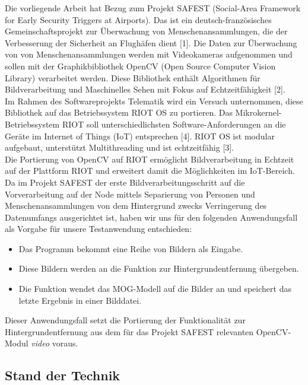 \documentclass[10pt,a4paper]{article}
\begin{document}
Die vorliegende Arbeit hat Bezug zum Projekt SAFEST (Social-Area Framework for Early Security Triggers at Airports). Das ist ein deutsch-französisches Gemeinschaftsprojekt zur Überwachung von Menschenansammlungen, die der Verbesserung der Sicherheit an Flughäfen dient [1]. Die Daten zur Überwachung von von Menschenansammlungen werden mit Videokameras aufgenommen und sollen mit der Graphikbibliothek OpenCV (Open Source Computer Vision Library) verarbeitet werden. Diese Bibliothek enthält Algorithmen für Bildverarbeitung und Maschinelles Sehen mit Fokus auf Echtzeitfähigkeit [2]. \\

Im Rahmen des Softwareprojekts Telematik wird ein Versuch unternommen, diese Bibliothek auf das Betriebssystem RIOT OS zu portieren. Das Mikrokernel-Betriebssystem RIOT soll unterschiedlichsten Software-Anforderungen an die Geräte im Internet of Things (IoT) entsprechen [4]. RIOT OS ist modular aufgebaut, unterstützt Multithreading und ist echtzeitfähig [3]. \\

Die Portierung von OpenCV auf RIOT ermöglicht Bildverarbeitung in Echtzeit auf der Plattform RIOT und erweitert damit die Möglichkeiten im IoT-Bereich. \\

Da im Projekt SAFEST der erste Bildverarbeitungsschritt auf die Vorverarbeitung auf der Node mittels Separierung von Personen und Menschenansammlungen von dem Hintergrund zwecks Verringerung des Datenumfangs ausgerichtet ist, haben wir uns für den folgenden Anwendungsfall als Vorgabe für unsere Testanwendung entschieden: 

\begin{itemize}
\item Das Programm bekommt eine Reihe von Bildern als Eingabe.
\item Diese Bildern werden an die Funktion zur Hintergrundentfernung übergeben. 
\item Die Funktion wendet das MOG-Modell auf die Bilder an und speichert das letzte Ergebnis in einer Bilddatei.
\end{itemize}

Dieser Anwendungsfall setzt die Portierung der Funktionalität zur Hintergrundentfernung aus dem für das Projekt SAFEST relevanten OpenCV-Modul {\it video} voraus.

\subsection{Stand der Technik}
\end{document}
